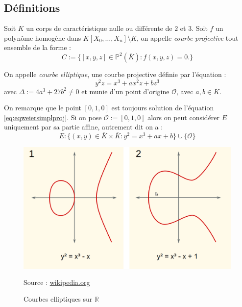 \documentclass[a4paper]{article} %
\numberwithin{section}{part}
\numberwithin{equation}{section}
\newcommand\RR{\mathbb{R}}
\newcommand\EO{\mathcal{O}}
\newcommand\PP[1]{\mathbb{P}^{#1}}
\begin{document}
\subsection{Définitions}
\label{sec:elldef}
Soit $K$ un corps de caractéristique nulle ou différente de $2$ et $3$. Soit $f$
un polynôme homogène dans $K[X_0,\dots,X_n]\setminus K$, 
on appelle \emph{courbe projective} tout ensemble de la forme :
\begin{equation}
C := \lbrace{[x,y,z]\in \PP{2}(\overline{K}) : f(x,y,z) = 0}.\rbrace
\end{equation}
\begin{defn}
On appelle \emph{courbe elliptique}, une courbe projective définie par 
l'équation :
\begin{equation}
\label{eq:eqweiersimplproj}
y^2z = x^3 + ax^2z + bz^3
\end{equation}
avec $\Delta := 4a^3 + 27b^2\neq0$ et munie d'un point d'origine $\EO$, avec
$a,b\in\overline{K}$.
\end{defn}
\begin{rem}
On remarque que le point $[0,1,0]$ est toujours solution de l'équation
\ref{eq:eqweiersimplproj}. Si on pose $\EO := [0,1,0]$ alors on peut considérer
$E$ uniquement par sa partie affine, autrement dit on a :
\begin{equation}
\label{eq:weiersimpl}
E : \lbrace{(x,y)\in\overline{K}\times\overline{K} : y^2 = x^3 + ax + b}\rbrace
\cup\lbrace{\EO}\rbrace
\end{equation}
\end{rem}
\begin{figure}[H]
\begin{center}
\includegraphics[scale=0.3]{EllipticCurves}\\
\caption{Courbes elliptiques sur $\RR$ }
\label{fig:ellcurve} 
Source : 
\href{http://en.wikipedia.org/wiki/Elliptic_curve}{wikipedia.org} 
\end{center}
\end{figure}
\end{document}
